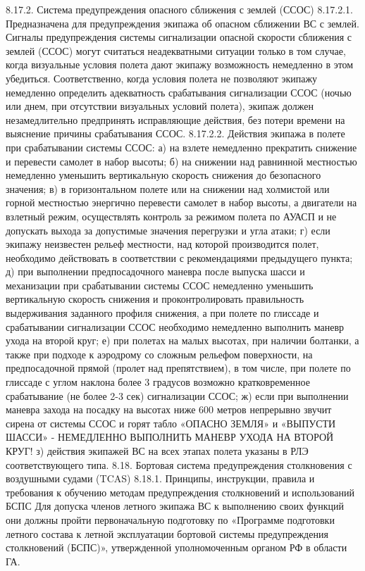 8.17.2.	Система предупреждения опасного сближения с землей (ССОС)
8.17.2.1. Предназначена для предупреждения экипажа об опасном сближении ВС с землей.
Сигналы предупреждения системы сигнализации опасной скорости сближения с землей (ССОС) могут считаться неадекватными ситуации только в том случае, когда визуальные условия полета дают экипажу возможность немедленно в этом убедиться. Соответственно, когда условия полета не позволяют экипажу немедленно определить адекватность срабатывания сигнализации ССОС (ночью или днем, при отсутствии визуальных условий полета), экипаж должен незамедлительно предпринять исправляющие действия, без потери времени на выяснение причины срабатывания ССОС.
8.17.2.2. Действия экипажа в полете при срабатывании системы ССОС:
а)	на взлете немедленно прекратить снижение и перевести самолет в набор высоты;
б)	на снижении над равнинной местностью немедленно уменьшить вертикальную скорость снижения до безопасного значения;
в)	в горизонтальном полете или на снижении над холмистой или горной местностью энергично перевести самолет в набор высоты, а двигатели на взлетный режим, осуществлять контроль за режимом полета по АУАСП и не допускать выхода за допустимые значения перегрузки и угла атаки;
г)	если экипажу неизвестен рельеф местности, над которой производится полет, необходимо действовать в соответствии с рекомендациями предыдущего пункта;
д)	при выполнении предпосадочного маневра после выпуска шасси и механизации при срабатывании системы ССОС немедленно уменьшить вертикальную скорость снижения и проконтролировать правильность выдерживания заданного профиля снижения, а при полете по глиссаде и срабатывании сигнализации ССОС необходимо немедленно выполнить маневр ухода на второй круг;
е)	при полетах на малых высотах, при наличии болтанки, а также при подходе к аэродрому со сложным рельефом поверхности, на предпосадочной прямой (пролет над препятствием), в том числе, при полете по глиссаде с углом наклона более 3 градусов возможно кратковременное срабатывание (не более 2-3 сек) сигнализации ССОС;
ж)	если при выполнении маневра захода на посадку на высотах ниже 600 метров непрерывно звучит сирена от системы ССОС и горят табло «ОПАСНО ЗЕМЛЯ» и «ВЫПУСТИ ШАССИ» - НЕМЕДЛЕННО ВЫПОЛНИТЬ МАНЕВР УХОДА НА ВТОРОЙ КРУГ!
з)	действия экипажей ВС на всех этапах полета указаны в РЛЭ соответствующего типа.
8.18. Бортовая система предупреждения столкновения с воздушными судами (TCAS)
8.18.1. Принципы, инструкции, правила и требования к обучению методам 
                      предупреждения   столкновений и использований БСПС
Для допуска членов летного экипажа ВС к выполнению своих функций они должны пройти первоначальную подготовку по «Программе подготовки летного состава к летной эксплуатации бортовой системы предупреждения столкновений (БСПС)», утвержденной уполномоченным органом РФ в области ГА.
